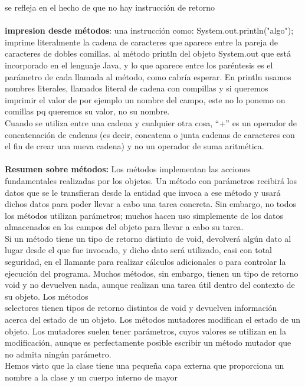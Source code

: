\documentclass[11pt,a4paper]{article}
\begin{document}
	se refleja en el hecho de que no hay instrucción de retorno\\
	\\
	\textbf{impresion desde métodos}: una
	instrucción como: System.out.println("algo");\\ imprime literalmente la cadena de caracteres que aparece entre la pareja de caracteres de dobles
	comillas. al método println
	del objeto System.out que está incorporado en el lenguaje Java, y lo que aparece entre los paréntesis
	es el parámetro de cada llamada al método, como cabría esperar. En println usamos nombres literales, llamados literal de cadena con compillas y si queremos imprimir el valor de por ejemplo un nombre del campo, este no lo ponemo on comillas pq queremos su valor, no su nombre.\\
	Cuando se utiliza entre una cadena y cualquier otra cosa, “+” es un operador de concatenación de
	cadenas (es decir, concatena o junta cadenas de caracteres con el fin de crear una nueva cadena)
	y no un operador de suma aritmética.\\
	\\
	\textbf{Resumen sobre métodos:} Los métodos implementan las acciones fundamentales realizadas por los objetos. Un método con parámetros recibirá los datos que se le transfieran desde la entidad que invoca a
	ese método y usará dichos datos para poder llevar a cabo una tarea concreta. Sin embargo,
	no todos los métodos utilizan parámetros; muchos hacen uso simplemente de los datos almacenados
	en los campos del objeto para llevar a cabo su tarea.\\
	Si un método tiene un tipo de retorno distinto de void, devolverá algún dato al lugar desde el que
	fue invocado, y dicho dato será utilizado, casi con total seguridad, en el llamante para realizar
	cálculos adicionales o para controlar la ejecución del programa. Muchos métodos, sin embargo,
	tienen un tipo de retorno void y no devuelven nada, aunque realizan una tarea útil dentro del contexto
	de su objeto.
	Los métodos\\ selectores tienen tipos de retorno distintos de void y devuelven información acerca
	del estado de un objeto. Los métodos mutadores modifican el estado de un objeto. Los mutadores
	suelen tener parámetros, cuyos valores se utilizan en la modificación, aunque es perfectamente
	posible escribir un método mutador que no admita ningún parámetro.\\
	Hemos visto que la clase tiene
	una pequeña capa externa que proporciona un nombre a la clase y un cuerpo interno de mayor
\end{document}
